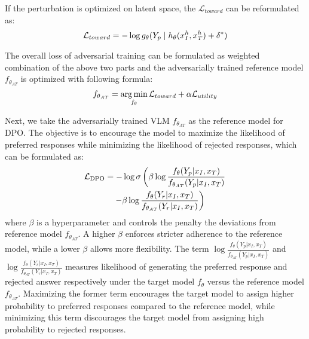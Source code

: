 If the perturbation is optimized on latent space, the $\mathcal{L}_{toward}$ can be reformulated as:
\vspace{-0.5em}
\begin{equation}
\fontsize{10}{12}
    \mathcal{L}_{toward} = -\log g_\theta(Y_{p} \mid h_{\theta}(x_I^{h}, x_T^{h})+ \delta^* )
    \vspace{-0.5em}
\end{equation}

The overall loss of adversarial training can be formulated as weighted combination of the above two parts and the adversarially trained reference model $f_{\theta_{AT}}$ is optimized with following formula:
\vspace{-0.5em}
\begin{equation}
\fontsize{10}{12}
\label{euqation 7}
    f_{\theta_{AT}} = \argmin_{f_\theta} \mathcal{L}_{toward} + \alpha\mathcal{L}_{utility}
\end{equation}
\vspace{-0.5em}

Next, we take the adversarially trained VLM $f_{\theta_{AT}}$ as the reference model for DPO. The objective is to encourage the model to maximize the likelihood of preferred responses while minimizing the likelihood of rejected responses, which can be formulated as:
\vspace{-0.5em}
{\fontsize{10}{12}
\begin{align}
\mathcal{L}_{\text{DPO}} &= -\log \sigma \left( \beta \log \frac{f_{\theta}(Y_{p} | x_I, x_T)}{f_{\theta_{AT}}(Y_{p} | x_I, x_T)} \right. \notag \\
&\quad \left. - \beta \log \frac{f_{\theta}(Y_{r} | x_I, x_T)}{f_{\theta_{AT}}(Y_{r} | x_I, x_T)} \right)
\end{align}}
where $\beta$ is a hyperparameter and controls the penalty the deviations from reference model $f_{\theta_{AT}}$. A higher $\beta$ enforces stricter adherence to the reference model, while a lower
$\beta$ allows more flexibility. The term $\log \frac{f_{\theta}(Y_{p} | x_I, x_T)}{f_{\theta_{AT}}(Y_{p} | x_I, x_T)}$ and $\log \frac{f_{\theta}(Y_{r} | x_I, x_T)}{f_{\theta_{AT}}(Y_{r} | x_I, x_T)}$ measures likelihood of generating the preferred response and rejected answer respectively under the target model $f_{\theta}$ versus the reference model $f_{\theta_{AT}}$. Maximizing the former term encourages the target model to assign higher probability to preferred responses compared to the reference model, while minimizing this term discourages the target model from assigning high probability to rejected responses.


